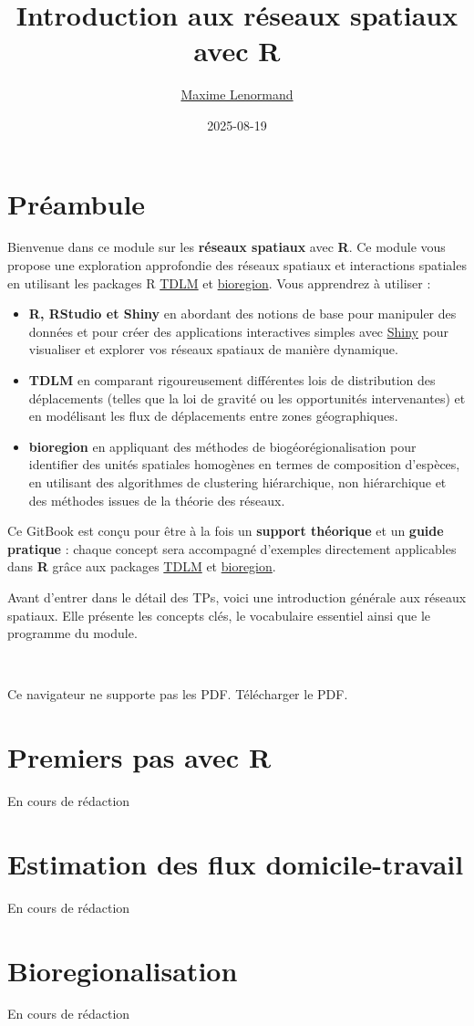 \documentclass[
]{article}
\title{Introduction aux réseaux spatiaux avec R}
\author{\href{https://www.maximelenormand.com/}{Maxime Lenormand}}
\date{2025-08-19}
\begin{document}
\maketitle

{
\setcounter{tocdepth}{2}
\tableofcontents
}
\section*{Préambule}\label{preambule}

Bienvenue dans ce module sur les \textbf{réseaux spatiaux} avec \textbf{R}. Ce module vous
propose une exploration approfondie des réseaux spatiaux et interactions
spatiales en utilisant les packages R \href{https://rtdlm.github.io/TDLM/}{TDLM} et
\href{https://biorgeo.github.io/bioregion/}{bioregion}. Vous apprendrez
à utiliser :

\begin{itemize}
\item
  \textbf{R, RStudio et Shiny} en abordant des
  notions de base pour manipuler des données et pour créer des applications
  interactives simples avec \href{https://shiny.posit.co/}{Shiny} pour visualiser et
  explorer vos réseaux spatiaux de manière dynamique.
\item
  \textbf{TDLM} en comparant rigoureusement différentes lois de distribution des
  déplacements (telles que la loi de gravité ou les opportunités intervenantes)
  et en modélisant les flux de déplacements entre zones géographiques.
\item
  \textbf{bioregion} en appliquant des méthodes de biogéorégionalisation pour
  identifier des unités spatiales homogènes en termes de composition d'espèces,
  en utilisant des algorithmes de clustering hiérarchique, non hiérarchique et
  des méthodes issues de la théorie des réseaux.
\end{itemize}

Ce GitBook est conçu pour être à la fois un \textbf{support théorique} et un
\textbf{guide pratique} : chaque concept sera accompagné d'exemples directement
applicables dans \textbf{R} grâce aux packages
\href{https://rtdlm.github.io/TDLM/}{TDLM} et
\href{https://biorgeo.github.io/bioregion/}{bioregion}.

Avant d'entrer dans le détail des TPs, voici une
introduction générale aux réseaux spatiaux. Elle présente les concepts clés,
le vocabulaire essentiel ainsi que le programme du module.

~

Ce navigateur ne supporte pas les PDF. Télécharger le PDF.

\section{Premiers pas avec R}\label{tp1}

En cours de rédaction

\section{Estimation des flux domicile-travail}\label{tp2}

En cours de rédaction

\section{Bioregionalisation}\label{tp3}

En cours de rédaction
\end{document}
